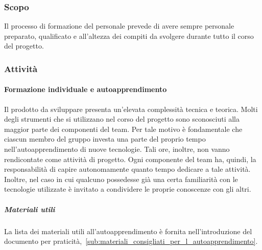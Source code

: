\documentclass[../../norme-di-progetto.tex]{subfiles}
\begin{document}
\subsubsection{Scopo}%
\label{subs:formazione_del_personale/scopo}

Il processo di formazione del personale prevede di avere sempre personale preparato, qualificato e all'altezza dei compiti da svolgere durante tutto il corso del progetto.

\subsubsection{Attività}%
\label{subs:formazione_del_personale/attivita}

\paragraph{Formazione individuale e autoapprendimento}%
\label{par:formazione_individuale_e_autoapprendimento}

Il prodotto da sviluppare presenta un'elevata complessità tecnica e teorica.
Molti degli strumenti che si utilizzano nel corso del progetto sono sconosciuti alla maggior parte dei componenti del team.
Per tale motivo è fondamentale che ciascun membro del gruppo investa una parte del proprio tempo nell'autoapprendimento di nuove tecnologie.
Tali ore, inoltre, non vanno rendicontate come attività di progetto.
Ogni componente del team ha, quindi, la responsabilità di capire autonomamente quanto tempo dedicare a tale attività.
Inoltre, nel caso in cui qualcuno possedesse già una certa familiarità con le tecnologie utilizzate è invitato a condividere le proprie conoscenze con gli altri.

\subparagraph{Materiali utili}%
\label{subp:materiali_utili}

La lista dei materiali utili all'autoapprendimento è fornita nell'introduzione del documento per praticità,~\ref{sub:materiali_consigliati_per_l_autoapprendimento}.
\end{document}
